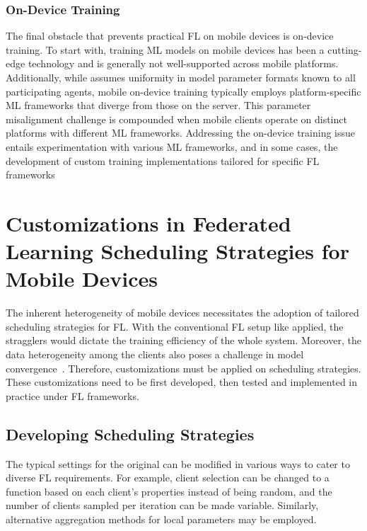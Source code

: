 \documentclass[conference]{IEEEtran}
\begin{document}
\subsubsection{On-Device Training}

The final obstacle that prevents practical FL on mobile devices is
on-device training.
To start with, training ML models on mobile devices has been
a cutting-edge technology and
is generally not well-supported across mobile platforms.
Additionally,
while \FedAvg{} assumes uniformity in model parameter formats known to
all participating agents,
mobile on-device training typically employs platform-specific ML frameworks
that diverge from those on the server.
This parameter misalignment challenge is compounded when
mobile clients operate on distinct platforms with
different ML frameworks.
Addressing the on-device training issue entails
experimentation with various ML frameworks,
and in some cases,
the development of custom training implementations tailored for
specific FL frameworks

\section{Customizations in Federated Learning Scheduling Strategies for
    Mobile Devices
}

\label{sec:scheduling}

The inherent heterogeneity of mobile devices necessitates
the adoption of tailored scheduling strategies for FL.
With the conventional FL setup like \FedAvg{} applied,
the stragglers would dictate the training efficiency of the whole system.
Moreover, the data heterogeneity among the clients also poses a challenge in
model convergence~\cite{zhang2022fedada}.
Therefore, customizations must be applied on scheduling strategies.
These customizations need to be first developed,
then tested and implemented in practice under FL frameworks.

\subsection{Developing Scheduling Strategies}

The typical settings for the original \FedAvg{} can be modified in
various ways to cater to diverse FL requirements.
For example,
client selection can be changed to a function based on
each client's properties instead of being random,
and the number of clients sampled per iteration can be made variable.
Similarly, alternative aggregation methods for local parameters
may be employed.
\end{document}
